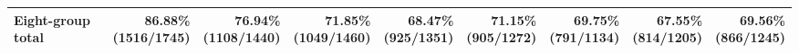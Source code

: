 \documentclass{article} %
\begin{document}
\begin{table}[htbp]
{\begin{tabular}{@{}lrrrrrrrr@{}}
			Eight-group total & \shortstack{86.88\%\\(1516/1745)} & \shortstack{76.94\%\\(1108/1440)} & \shortstack{71.85\%\\(1049/1460)} & \shortstack{68.47\%\\(925/1351)} & \shortstack{71.15\%\\(905/1272)} & \shortstack{69.75\%\\(791/1134)} & \shortstack{67.55\%\\(814/1205)} & \shortstack{69.56\%\\(866/1245)} \\
			\bottomrule
		\end{tabular}%
		}
	\end{table}

	\begin{table}[htbp]
		\centering
		\caption{Detailed AutoBencher results with \texttt{qwen3.8-27b} as the
			target model. Each cell reports accuracy above correct / total counts. R denotes the round; totals are weighted by item count.}
		\label{tab:autobencher-qwen-results}
		\scriptsize
\end{table}
\end{document}
